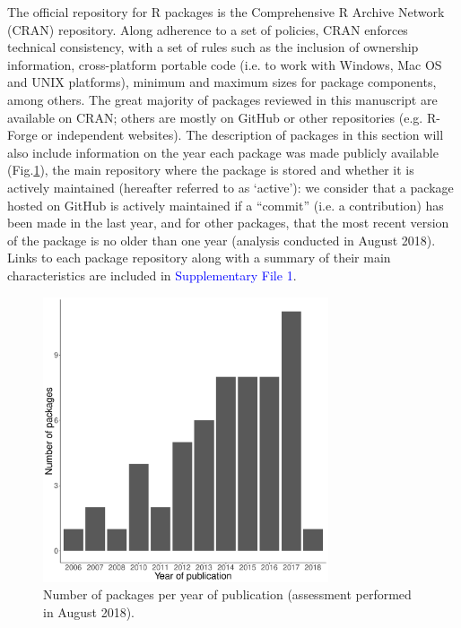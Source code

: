 \documentclass[a4paper,12pt]{article}
\begin{document}
The official repository for R packages is the Comprehensive R Archive Network (CRAN) repository. Along adherence to a set of policies, CRAN enforces technical consistency, with a set of rules such as the inclusion of ownership information, cross-platform portable code (i.e. to work with Windows, Mac OS and UNIX platforms), minimum and maximum sizes for package components, among others. The great majority of packages reviewed in this manuscript are available on CRAN; others are mostly on GitHub or other repositories (e.g. R-Forge or independent websites). %
The description of packages in this section %
will also include information on the year each package was made publicly available (Fig.\ref{fig:PkgYear}), %
the main repository where the package is stored and whether it is actively maintained (hereafter referred to as `active'): we consider that a package hosted on GitHub is actively maintained if a ``commit'' (i.e. a contribution) has been made in the last year, and for other packages, that the most recent version of the package is no older than one year (analysis conducted in August 2018). Links to each package repository along with a summary of their main characteristics are included in \textcolor{blue}{Supplementary File 1}. 

\begin{figure}
        \centering
        \includegraphics[width=0.75\textwidth]{./mes_images/packages_per_year.pdf}
        \caption{\label{fig:PkgYear} Number of packages per year of publication (assessment performed in August 2018).} %
\end{figure} 
\end{document}
